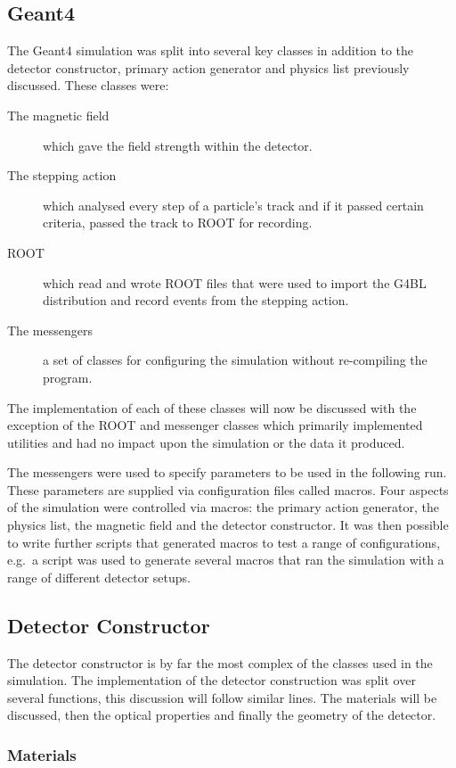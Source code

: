 \subsection{Geant4} %
\label{sub:geant4}
The Geant4 simulation was split into several key classes in addition to the detector constructor, primary action generator and physics list previously discussed. These classes were:
\begin{description}
  \item[The magnetic field] which gave the field strength within the detector.
  \item[The stepping action] which analysed every step of a particle's track and if it passed certain criteria, passed the track to ROOT for recording.
  \item[ROOT] which read and wrote ROOT files that were used to import the G4BL distribution and record events from the stepping action.
  \item[The messengers] a set of classes for configuring the simulation without re-compiling the program.
\end{description}
The implementation of each of these classes will now be discussed with the exception of the ROOT and messenger classes which primarily implemented utilities and had no impact upon the simulation or the data it produced.

The messengers were used to specify parameters to be used in the following run. These parameters are supplied via configuration files called macros. Four aspects of the simulation were controlled via macros: the primary action generator, the physics list, the magnetic field and the detector constructor. It was then possible to write further scripts that generated macros to test a range of configurations, e.g.\ a script was used to generate several macros that ran the simulation with a range of different detector setups.

\subsection{Detector Constructor} %
\label{sec:detector_constructor}
The detector constructor is by far the most complex of the classes used in the simulation. The implementation of the detector construction was split over several functions, this discussion will follow similar lines. The materials will be discussed, then the optical properties and finally the geometry of the detector.

\subsubsection{Materials} %
\label{ssub:implementation_materials}


